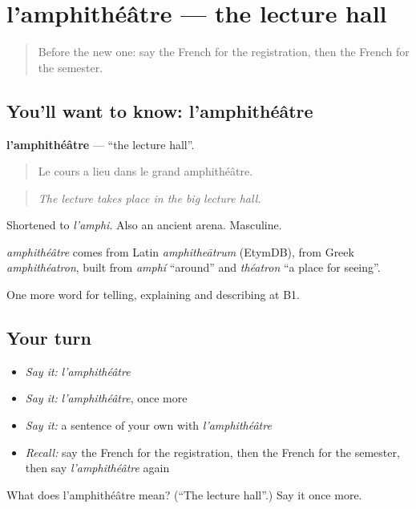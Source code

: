 \section[l'amphithéâtre]{l'amphithéâtre — the lecture hall}

\label{lesson:FR-C376-amphitheatre}



\begin{quote}
Before the new one: say the French for the registration, then the French for the semester.
\end{quote}

\subsection*{You'll want to know: l'amphithéâtre}
\textbf{l'amphithéâtre} — \textquotedblleft{}the lecture hall\textquotedblright{}.

\begin{quote}
Le cours a lieu dans le grand amphithéâtre.
\end{quote}

\begin{quote}
\emph{The lecture takes place in the big lecture hall.}
\end{quote}

Shortened to \emph{l'amphi}. Also an ancient arena. Masculine.

\begin{cousinweb}
\emph{amphithéâtre} comes from Latin \emph{amphitheātrum} (EtymDB), from Greek \emph{amphithéatron}, built from \emph{amphí} \textquotedblleft{}around\textquotedblright{} and \emph{théatron} \textquotedblleft{}a place for seeing\textquotedblright{}.
\end{cousinweb}

\begin{grammarlens}[title={What you've built}]
One more word for telling, explaining and describing at B1.
\end{grammarlens}

\subsection*{Your turn}
\begin{itemize}
\raggedright
  \item \emph{Say it:} \emph{l'amphithéâtre}
  \item \emph{Say it:} \emph{l'amphithéâtre}, once more
  \item \emph{Say it:} a sentence of your own with \emph{l'amphithéâtre}
  \item \emph{Recall:} say the French for the registration, then the French for the semester, then say \emph{l'amphithéâtre} again
\end{itemize}

\begin{tcolorbox}[breakable,colback=teal!4,colframe=teal!35!black,title={Before you move on}]
What does l'amphithéâtre mean? (\textquotedblleft{}The lecture hall\textquotedblright{}.) Say it once more.
\end{tcolorbox}
